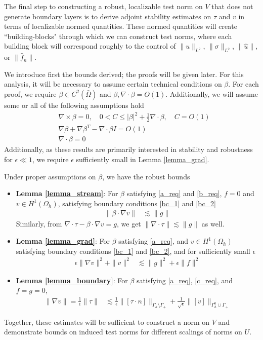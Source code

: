 \documentclass[11pt,onecolumn]{scrartcl}
\newcommand{\grad}{\nabla}
\newcommand{\curl}{\grad \times}
\renewcommand{\div}{\grad \cdot}
\begin{document}
The final step to constructing a robust, localizable test norm on $V$ that does not generate boundary layers is to derive adjoint stability estimates on $\tau$ and $v$ in terms of localizable normed quantities.  These normed quantities will create ``building-blocks" through which we can construct test norms, where each building block will correspond roughly to the control of $\|u\|_{L^2}$, $\|\sigma\|_{L^2}$, $\|\widehat{u}\|$, or $\|\widehat{f}_n\|$.  

We introduce first the bounds derived; the proofs will be given later. For this analysis, it will be necessary to assume certain technical conditions on $\beta$.  For each proof, we require $\beta \in C^2(\bar{\Omega})$ and $\beta, \div \beta = O(1)$.  Additionally, we will assume some or all of the following assumptions hold
\begin{align}
&\curl \beta = 0, \quad 0<C \leq \left | \beta\right |^2 + \frac{1}{2}\div \beta, \quad C = O(1) \label{a_req}\\
&\grad \beta + \grad \beta ^T - \div \beta I = O(1) \label{b_req}\\
&\div \beta = 0 \label{c_req}
\end{align}
Additionally, as these results are primarily interested in stability and robustness for $\epsilon \ll 1$, we require $\epsilon$ sufficiently small in Lemma \ref{lemma_grad}.  

Under proper assumptions on $\beta$, we have the robust bounds
\begin{itemize}
\item \textbf{Lemma \ref{lemma_stream}}: For $\beta$ satisfying \eqref{a_req} and \eqref{b_req}, $f=0$ and $v \in H^1(\Omega_h)$, satisfying boundary conditions \eqref{bc_1} and \eqref{bc_2}
\begin{align*}
\|\beta \cdot \grad v \| &\lesssim \| g\| 
\end{align*}
Similarly, from $\div \tau - \beta\cdot \grad v = g$, we get $\|\div \tau\| \lesssim \|g\|$ as well.  
\item \textbf{Lemma \ref{lemma_grad}}: For $\beta$ satisfying \eqref{a_req}, and $v \in H^1(\Omega_h)$ satisfying boundary conditions \eqref{bc_1} and \eqref{bc_2}, and for sufficiently small $\epsilon$
\begin{align*}
\epsilon \|\grad v\|^2 + \|v\|^2 &\lesssim \|g\|^2 + \epsilon \| f\|^2
\end{align*}
\item \textbf{Lemma \ref{lemma_boundary}}: For $\beta$ satisfying \eqref{a_req}, \eqref{c_req}, and $f=g=0$, 
\begin{align*}
\|\grad v\| = \frac{1}{\epsilon}\|\tau\| &\lesssim \frac{1}{\epsilon} \| [\tau\cdot n]\|_{\Gamma_h \setminus \Gamma_+} + \frac{1}{\sqrt{\epsilon}} \| [v]\|_{\Gamma_h^0 \cup \Gamma_+}
\end{align*}
\end{itemize}
Together, these estimates will be sufficient to construct a norm on $V$ and demonstrate bounds on induced test norms for different scalings of norms on $U$.  
\end{document}
